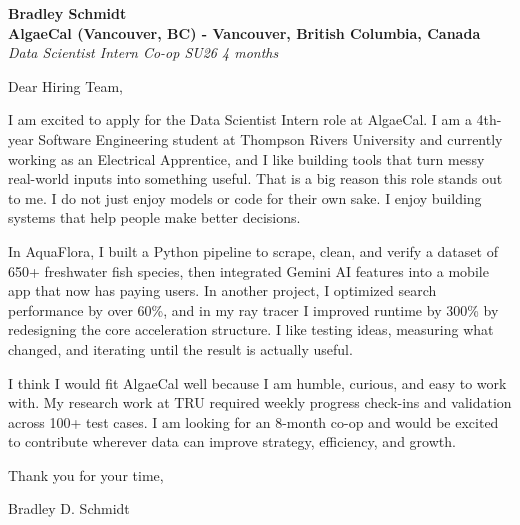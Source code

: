 \documentclass[11pt]{article}
\begin{document}
\textbf{Bradley Schmidt}\\
\vspace{0.5em}
\textbf{AlgaeCal (Vancouver, BC) - Vancouver, British Columbia, Canada}\\
\textit{Data Scientist Intern Co-op SU26 4 months}

Dear Hiring Team,

\par

I am excited to apply for the Data Scientist Intern role at AlgaeCal. I am a 4th-year Software Engineering student at Thompson Rivers University and currently working as an Electrical Apprentice, and I like building tools that turn messy real-world inputs into something useful. That is a big reason this role stands out to me. I do not just enjoy models or code for their own sake. I enjoy building systems that help people make better decisions.

\par

In AquaFlora, I built a Python pipeline to scrape, clean, and verify a dataset of 650+ freshwater fish species, then integrated Gemini AI features into a mobile app that now has paying users. In another project, I optimized search performance by over 60\%, and in my ray tracer I improved runtime by 300\% by redesigning the core acceleration structure. I like testing ideas, measuring what changed, and iterating until the result is actually useful.

\par

I think I would fit AlgaeCal well because I am humble, curious, and easy to work with. My research work at TRU required weekly progress check-ins and validation across 100+ test cases. I am looking for an 8-month co-op and would be excited to contribute wherever data can improve strategy, efficiency, and growth.

\par

Thank you for your time,

\par

Bradley D. Schmidt
\end{document}
